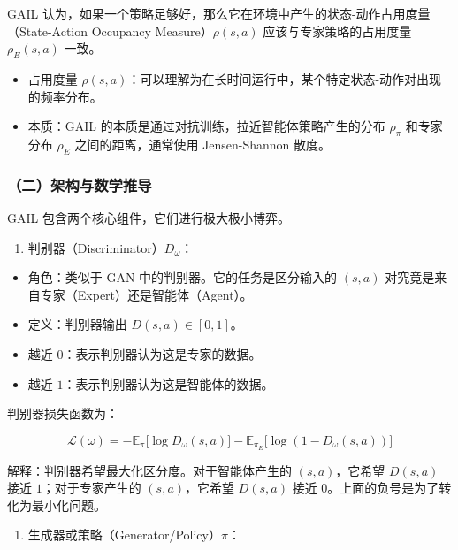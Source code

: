 GAIL 认为，如果一个策略足够好，那么它在环境中产生的状态-动作占用度量（State-Action Occupancy Measure）\(\rho(s,a)\) 应该与专家策略的占用度量 \(\rho_E(s,a)\) 一致。

\begin{itemize}
\tightlist
\item
  占用度量 \(\rho(s,a)\)：可以理解为在长时间运行中，某个特定状态-动作对出现的频率分布。
\item
  本质：GAIL 的本质是通过对抗训练，拉近智能体策略产生的分布 \(\rho_\pi\) 和专家分布 \(\rho_E\) 之间的距离，通常使用 Jensen-Shannon 散度。
\end{itemize}

\hypertarget{ux4e8cux67b6ux6784ux4e0eux6570ux5b66ux63a8ux5bfc}{%
\subsubsection{（二）架构与数学推导}\label{ux4e8cux67b6ux6784ux4e0eux6570ux5b66ux63a8ux5bfc}}

GAIL 包含两个核心组件，它们进行极大极小博弈。

\begin{enumerate}
\def\labelenumi{\arabic{enumi}.}
\tightlist
\item
  判别器（Discriminator）\(D_\omega\)：
\end{enumerate}

\begin{itemize}
\tightlist
\item
  角色：类似于 GAN 中的判别器。它的任务是区分输入的 \((s,a)\) 对究竟是来自专家（Expert）还是智能体（Agent）。
\item
  定义：判别器输出 \(D(s,a)\in[0,1]\)。
\item
  越近 \(0\)：表示判别器认为这是专家的数据。
\item
  越近 \(1\)：表示判别器认为这是智能体的数据。
\end{itemize}

判别器损失函数为：

\[
\mathcal{L}(\omega)
=
-
\mathbb{E}_{\pi}
\bigl[
\log D_\omega(s,a)
\bigr]
-
\mathbb{E}_{\pi_E}
\bigl[
\log(1-D_\omega(s,a))
\bigr]
\]

解释：判别器希望最大化区分度。对于智能体产生的 \((s,a)\)，它希望 \(D(s,a)\) 接近 \(1\)；对于专家产生的 \((s,a)\)，它希望 \(D(s,a)\) 接近 \(0\)。上面的负号是为了转化为最小化问题。

\begin{enumerate}
\def\labelenumi{\arabic{enumi}.}
\setcounter{enumi}{1}
\tightlist
\item
  生成器或策略（Generator/Policy）\(\pi\)：
\end{enumerate}

